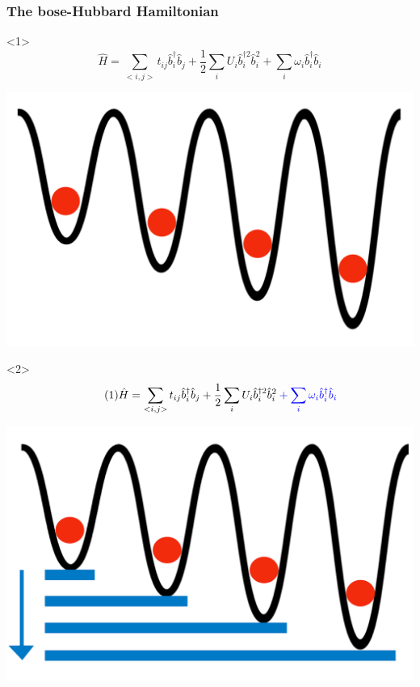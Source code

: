 \documentclass[aspectratio=169]{beamer}
\begin{document}
\begin{frame}
\frametitle{The bose-Hubbard Hamiltonian}
\begin{onlyenv}<1>
  \begin{equation}
    \hat{H} = \sum_{<i,j>} t_{ij}\hat{b}_i^\dagger \hat{b}_j + \frac{1}{2}\sum_i U_i\hat{b}_i^{\dagger 2} \hat{b}_i^{2} + \sum_i \omega_i \hat{b}_i^\dagger \hat{b}_i
  \end{equation}
  \begin{center}
    \includegraphics[scale=0.1]{../img/H.png}
  \end{center}
\end{onlyenv}
\begin{onlyenv}<2>
  \begin{equation}\tag{1}
    \hat{H} = \sum_{<i,j>} t_{ij}\hat{b}_i^\dagger \hat{b}_j + \frac{1}{2}\sum_i U_i\hat{b}_i^{\dagger 2} \hat{b}_i^{2} \color{blue}+ \sum_i \omega_i \hat{b}_i^\dagger \hat{b}_i
  \end{equation}
  \begin{center}
    \includegraphics[scale=0.1]{../img/omega.png}

\end{center}
\end{onlyenv}
\end{frame}
\end{document}
